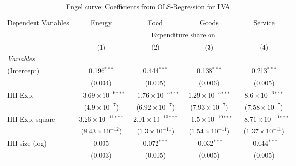 
\begin{table}[htbp!]
   \centering
   \small
   \begin{adjustbox}{width = 1\textwidth, max height = 0.95\textheight, center}
      \begin{threeparttable}[b]
         \caption{\label{tab:Engel_parametric_LVA} Engel curve: Coefficients from OLS-Regression for LVA}
         \begin{tabular}{lcccc}
            \tabularnewline \midrule \midrule
            Dependent Variables: & Energy                         & Food                           & Goods                          & Service\\  
             & \multicolumn{4}{c}{Expenditure share on} \\ 
                                 & (1)                            & (2)                            & (3)                            & (4)\\  
            \midrule
            \emph{Variables}\\
            (Intercept)          & 0.196$^{***}$                  & 0.444$^{***}$                  & 0.138$^{***}$                  & 0.213$^{***}$\\   
                                 & (0.004)                        & (0.005)                        & (0.006)                        & (0.005)\\   
            HH Exp.              & $-3.69\times 10^{-6}$$^{***}$  & $-1.76\times 10^{-5}$$^{***}$  & $1.29\times 10^{-5}$$^{***}$   & $8.6\times 10^{-6}$$^{***}$\\    
                                 & ($4.9\times 10^{-7}$)          & ($6.92\times 10^{-7}$)         & ($7.93\times 10^{-7}$)         & ($7.58\times 10^{-7}$)\\    
            HH Exp. square       & $3.26\times 10^{-11}$$^{***}$  & $2.01\times 10^{-10}$$^{***}$  & $-1.5\times 10^{-10}$$^{***}$  & $-8.71\times 10^{-11}$$^{***}$\\    
                                 & ($8.43\times 10^{-12}$)        & ($1.3\times 10^{-11}$)         & ($1.54\times 10^{-11}$)        & ($1.37\times 10^{-11}$)\\    
            HH size (log)        & 0.005                          & 0.072$^{***}$                  & -0.032$^{***}$                 & -0.044$^{***}$\\   
                                 & (0.003)                        & (0.005)                        & (0.005)                        & (0.005)\\   

\end{tabular}
\end{threeparttable}
\end{adjustbox}
\end{table}
